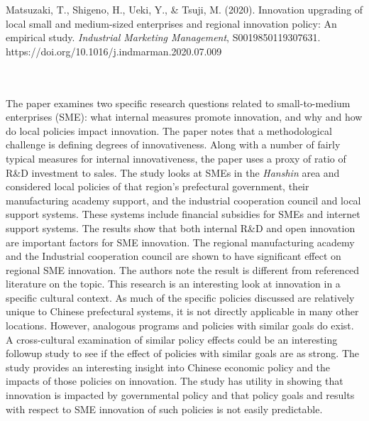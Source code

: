 \documentclass{apa7}
\begin{document}
\bigskip
\hfill\begin{minipage}{\dimexpr\textwidth-1in}
\begin{hangparas}{.25in}{1}
Matsuzaki, T., Shigeno, H., Ueki, Y., \& Tsuji, M. (2020). Innovation upgrading of local small and medium-sized enterprises and regional innovation policy: An empirical study. \textit{Industrial Marketing Management}, S0019850119307631. https://doi.org/10.1016/j.indmarman.2020.07.009
\end{hangparas}
\xdef\tpd{\the\prevdepth}
\end{minipage}
\\
\\
The paper examines two specific research questions related to small-to-medium enterprises (SME): what internal measures promote innovation, and why and how do local policies impact innovation. The paper notes that a methodological challenge is defining degrees of innovativeness. Along with a number of fairly typical measures for internal innovativeness, the paper uses a proxy of ratio of R\&D investment to sales. The study looks at SMEs in the \textit{Hanshin} area and considered local policies of that region's prefectural government, their manufacturing academy support, and the industrial cooperation council and local support systems. These systems include financial subsidies for SMEs and internet support systems. The results show that both internal R\&D and open innovation are important factors for SME innovation. The regional manufacturing academy and the Industrial cooperation council are shown to have significant effect on regional SME innovation. The authors note the result is different from referenced literature on the topic. This research is an interesting look at innovation in a specific cultural context. As much of the specific policies discussed are relatively unique to Chinese prefectural systems, it is not directly applicable in many other locations. However, analogous programs and policies with similar goals do exist. A cross-cultural examination of similar policy effects could be an interesting followup study to see if the effect of policies with similar goals are as strong. The study provides an interesting insight into Chinese economic policy and the impacts of those policies on innovation. The study has utility in showing that innovation is impacted by governmental policy and that policy goals and results with respect to SME innovation of such policies is not easily predictable.
\end{document}
